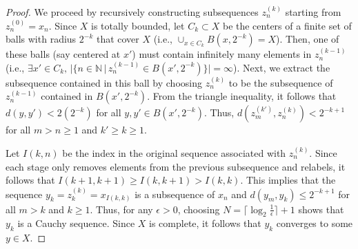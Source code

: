 \begin{proof}
We proceed by recursively constructing subsequences $z^{(k)}_n$ starting from $z^{(0)}_n = x_n$.
Since $X$ is totally bounded, let $C_k \subset X$ be the centers of a finite set of balls with radius $2^{-k}$ that cover $X$ (i.e., $\cup_{x\in C_k} B(x,2^{-k}) = X$).
Then, one of these balls (say centered at $x'$) must contain infinitely many elements in $z^{(k-1)}_n$ (i.e., $\exists x' \in C_k, \,|\{n\in \mathbb{N}\,|\,z^{(k-1)}_n \in B(x',2^{-k})\}|=\infty$).
Next, we extract the subsequence contained in this ball by choosing $z^{(k)}_n$ to be the subsequence of $z^{(k-1)}_n$ contained in $B(x',2^{-k})$.
From the triangle inequality, it follows that $d(y,y')<2(2^{-k})$ for all $y,y'\in B(x',2^{-k})$.
Thus, $d(z^{(k')}_m,z^{(k)}_n) < 2^{-k+1}$ for all $m>n\geq 1$ and $k'\geq k \geq 1$.

Let $I(k,n)$ be the index in the original sequence associated with $z^{(k)}_n$.
Since each stage only removes elements from the previous subsequence and relabels, it follows that $I(k+1,k+1) \geq I(k,k+1) > I(k,k)$.
This implies that the sequence $y_k = z^{(k)}_k = x_{I(k,k)}$ is a subsequence of $x_n$ and
$d(y_m,y_k) \leq 2^{-k+1}$ for all $m>k$ and $k\geq1$.
Thus, for any $\epsilon >0$, choosing $N = \lceil \log_2 \frac{1}{\epsilon} \rceil + 1$ shows that $y_k$ is a Cauchy sequence.
Since $X$ is complete, it follows that $y_k$ converges to some $y\in X$.
\iffalse
There is a subsequence that converges  if and only if there is an $x\in X$ such that, for all $\epsilon>0$, the ball $B(x,\epsilon)$ contains infinitely many elements in the sequence (i.e., $|\{n\in \mathbb{N}\,|\,x_n \in B(x,\epsilon)\}|=\infty$).
In this case, one can choose $n_1 < n_2 < \cdots$ so that $d(x,x_{n_j}) \! < \! \frac{1}{j}$ for all $j\in \mathbb{N}$ and, thus, the subsequence $x_{n_j}$ converges to $x$.

Suppose there is no convergent subsequence.
Then, for all $x\in X$, there is an $\epsilon >0$ such that $B(x,\epsilon)$ contains a finite number of elements in the sequence (i.e., $|\{n\in \mathbb{N}\,|\,x_n \in B(x,\epsilon)\}| \leq N<\infty$ ).
Since $X$ is totally bounded, we also find that, for any $\epsilon >0$, $X$ is covered by a finite number (say $M$) of balls with radius $\epsilon$.
But, for each $\epsilon >0$, this gives a contradiction because all the elements in the infinite sequence must fall into a finite number balls each containing finitely many elements.
By contradiction, this implies that there is a subsequence that converges.
\fi
\end{proof}

